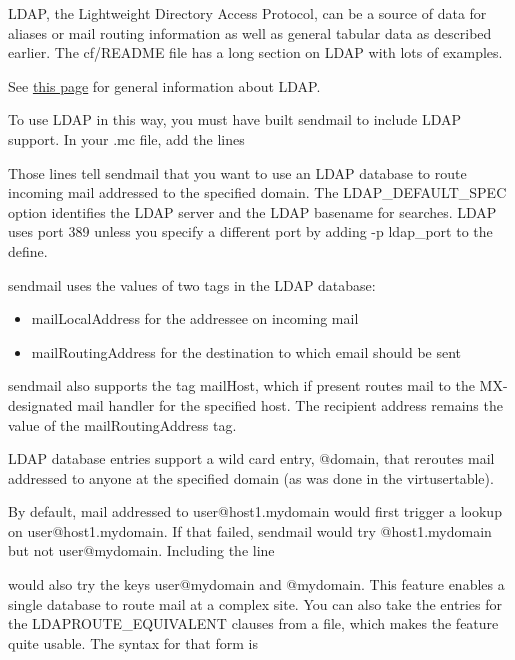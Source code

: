 \protect\hypertarget{part0026_split_034.htmlux5cux23_idIndexMarker2529}{}{}LDAP,
the Lightweight Directory Access Protocol, can be a source of data for
aliases or mail routing information as well as general tabular data as
described earlier. The {cf/README} file has a long section on LDAP with
lots of examples.

\leavevmode\hypertarget{part0026_split_034.htmlux5cux23_idContainer1142}{}%
See
\protect\hyperlink{part0025_split_002.htmlux5cux23_idTextAnchor974}{this
page} for general information about LDAP.

To use LDAP in this way, you must have built {sendmail} to include LDAP
support. In your {.mc} file, add the lines


Those lines tell {sendmail} that you want to use an LDAP database to
route incoming mail addressed to the specified domain. The
{LDAP\_DEFAULT\_SPEC} option identifies the LDAP server and the LDAP
basename for searches. LDAP uses port 389 unless you specify a different
port by adding {-p} {ldap\_port} to the {define}.

{sendmail} uses the values of two tags in the LDAP database:

\begin{itemize}
\item
  {mailLocalAddress} for the addressee on incoming mail
\item
  {mailRoutingAddress} for the destination to which email should be sent
\end{itemize}

{sendmail} also supports the tag {mailHost}, which if present routes
mail to the MX-designated mail handler for the specified host. The
recipient address remains the value of the {mailRoutingAddress} tag.

LDAP database entries support a wild card entry, {@domain}, that
reroutes mail addressed to anyone at the specified domain (as was done
in the {virtusertable}).

By default, mail addressed to user@host1.mydomain would first trigger a
lookup on user@host1.mydomain. If that failed, {sendmail} would try
@host1.mydomain but not user@mydomain. Including the line


would also try the keys user@mydomain and @mydomain. This feature
enables a single database to route mail at a complex site. You can also
take the entries for the {LDAPROUTE\_EQUIVALENT} clauses from a file,
which makes the feature quite usable. The syntax for that form is


